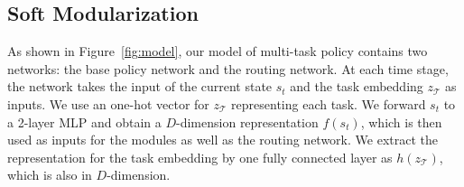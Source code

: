\documentclass{article}
\newcommand{\task}{\mathcal{T}}
\begin{document}
\vspace{-0.07in}
\subsection{Soft Modularization}
\vspace{-0.07in}

As shown in Figure~\ref{fig:model}, our model of multi-task policy contains two networks: the base policy network and the routing network. At each time stage, the network takes the input of the current state $s_t$ and the task embedding $z_\task$ as inputs. We use an one-hot vector for $z_\task$ representing each task. We forward $s_t$ to a 2-layer MLP and obtain a $D$-dimension representation $f(s_t)$, which is then used as inputs for the modules as well as the routing network. We extract the representation for the task embedding by one fully connected layer as $h(z_\task)$, which is also in $D$-dimension. 
\end{document}

